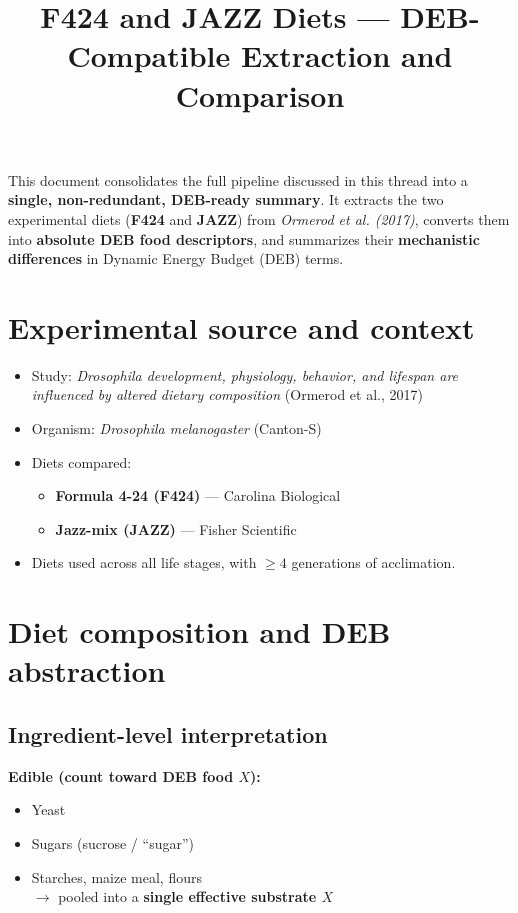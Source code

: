 \documentclass[11pt]{article}
\title{F424 and JAZZ Diets --- DEB-Compatible Extraction and Comparison}
\author{}
\date{}
\begin{document}
\maketitle

This document consolidates the full pipeline discussed in this thread into a \textbf{single, non-redundant, DEB-ready summary}. It extracts the two experimental diets (\textbf{F424} and \textbf{JAZZ}) from \emph{Ormerod et al. (2017)}, converts them into \textbf{absolute DEB food descriptors}, and summarizes their \textbf{mechanistic differences} in Dynamic Energy Budget (DEB) terms.

\section{Experimental source and context}

\begin{itemize}
  \item Study: \emph{Drosophila development, physiology, behavior, and lifespan are influenced by altered dietary composition} (Ormerod et al., 2017)
  \item Organism: \emph{Drosophila melanogaster} (Canton-S)
  \item Diets compared:
  \begin{itemize}
    \item \textbf{Formula 4-24 (F424)} --- Carolina Biological
    \item \textbf{Jazz-mix (JAZZ)} --- Fisher Scientific
  \end{itemize}
  \item Diets used across all life stages, with $\ge 4$ generations of acclimation.
\end{itemize}

\section{Diet composition and DEB abstraction}

\subsection{Ingredient-level interpretation}

\textbf{Edible (count toward DEB food $X$):}
\begin{itemize}
  \item Yeast
  \item Sugars (sucrose / ``sugar'')
  \item Starches, maize meal, flours\\
  $\rightarrow$ pooled into a \textbf{single effective substrate $X$}
\end{itemize}
\end{document}
